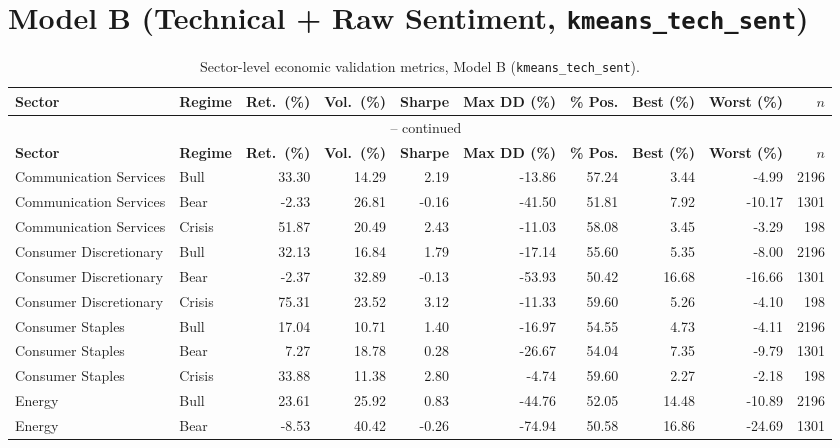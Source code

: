 \section{Model B (Technical + Raw Sentiment, \texttt{kmeans\_tech\_sent})}
\label{annex:tables-modelB}

\begin{landscape}
\begin{longtable}{llrrrrrrrr}
\caption{Sector-level economic validation metrics, Model B (\texttt{kmeans\_tech\_sent}).}
\label{tab:annexB-modelB}\\
\toprule
\textbf{Sector} & \textbf{Regime} & \textbf{Ret.\ (\%)} & \textbf{Vol.\ (\%)} & \textbf{Sharpe} & \textbf{Max DD (\%)} & \textbf{\% Pos.} & \textbf{Best (\%)} & \textbf{Worst (\%)} & \textbf{$n$} \\
\midrule
\endfirsthead
\multicolumn{10}{c}{\tablename\ \thetable{} -- continued} \\
\toprule
\textbf{Sector} & \textbf{Regime} & \textbf{Ret.\ (\%)} & \textbf{Vol.\ (\%)} & \textbf{Sharpe} & \textbf{Max DD (\%)} & \textbf{\% Pos.} & \textbf{Best (\%)} & \textbf{Worst (\%)} & \textbf{$n$} \\
\midrule
\endhead
\bottomrule
\endfoot
\bottomrule
\endlastfoot
Communication Services & Bull & 33.30 & 14.29 & 2.19 & -13.86 & 57.24 & 3.44 & -4.99 & 2196 \\
Communication Services & Bear & -2.33 & 26.81 & -0.16 & -41.50 & 51.81 & 7.92 & -10.17 & 1301 \\
Communication Services & Crisis & 51.87 & 20.49 & 2.43 & -11.03 & 58.08 & 3.45 & -3.29 & 198 \\
Consumer Discretionary & Bull & 32.13 & 16.84 & 1.79 & -17.14 & 55.60 & 5.35 & -8.00 & 2196 \\
Consumer Discretionary & Bear & -2.37 & 32.89 & -0.13 & -53.93 & 50.42 & 16.68 & -16.66 & 1301 \\
Consumer Discretionary & Crisis & 75.31 & 23.52 & 3.12 & -11.33 & 59.60 & 5.26 & -4.10 & 198 \\
Consumer Staples & Bull & 17.04 & 10.71 & 1.40 & -16.97 & 54.55 & 4.73 & -4.11 & 2196 \\
Consumer Staples & Bear & 7.27 & 18.78 & 0.28 & -26.67 & 54.04 & 7.35 & -9.79 & 1301 \\
Consumer Staples & Crisis & 33.88 & 11.38 & 2.80 & -4.74 & 59.60 & 2.27 & -2.18 & 198 \\
Energy & Bull & 23.61 & 25.92 & 0.83 & -44.76 & 52.05 & 14.48 & -10.89 & 2196 \\
Energy & Bear & -8.53 & 40.42 & -0.26 & -74.94 & 50.58 & 16.86 & -24.69 & 1301 \\

\end{longtable}
\end{landscape}
